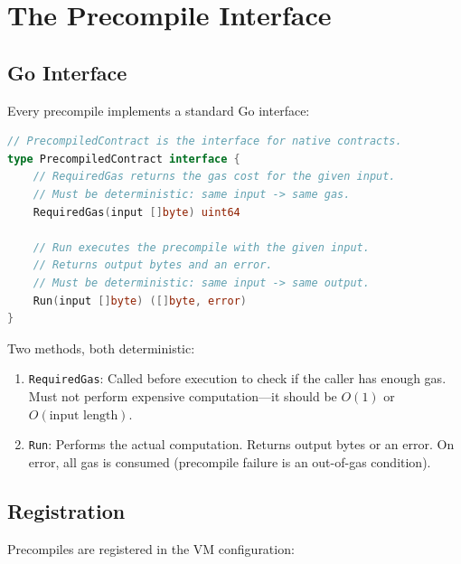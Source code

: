 \section{The Precompile Interface}


\subsection{Go Interface}

Every precompile implements a standard Go interface:

\begin{lstlisting}[language=Go,caption={The precompile interface}]
// PrecompiledContract is the interface for native contracts.
type PrecompiledContract interface {
    // RequiredGas returns the gas cost for the given input.
    // Must be deterministic: same input -> same gas.
    RequiredGas(input []byte) uint64

    // Run executes the precompile with the given input.
    // Returns output bytes and an error.
    // Must be deterministic: same input -> same output.
    Run(input []byte) ([]byte, error)
}
\end{lstlisting}

Two methods, both deterministic:
\begin{enumerate}[nosep]
  \item \texttt{RequiredGas}: Called before execution to check if the caller has enough gas.
    Must not perform expensive computation---it should be $O(1)$ or $O(\text{input length})$.
  \item \texttt{Run}: Performs the actual computation. Returns output bytes or an error.
    On error, all gas is consumed (precompile failure is an out-of-gas condition).
\end{enumerate}

\subsection{Registration}

Precompiles are registered in the VM configuration:


